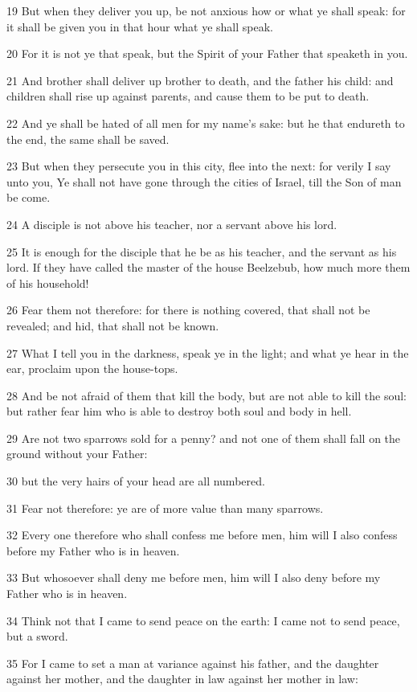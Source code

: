 \par 19 But when they deliver you up, be not anxious how or what ye shall speak: for it shall be given you in that hour what ye shall speak.
\par 20 For it is not ye that speak, but the Spirit of your Father that speaketh in you.
\par 21 And brother shall deliver up brother to death, and the father his child: and children shall rise up against parents, and cause them to be put to death.
\par 22 And ye shall be hated of all men for my name's sake: but he that endureth to the end, the same shall be saved.
\par 23 But when they persecute you in this city, flee into the next: for verily I say unto you, Ye shall not have gone through the cities of Israel, till the Son of man be come.
\par 24 A disciple is not above his teacher, nor a servant above his lord.
\par 25 It is enough for the disciple that he be as his teacher, and the servant as his lord. If they have called the master of the house Beelzebub, how much more them of his household!
\par 26 Fear them not therefore: for there is nothing covered, that shall not be revealed; and hid, that shall not be known.
\par 27 What I tell you in the darkness, speak ye in the light; and what ye hear in the ear, proclaim upon the house-tops.
\par 28 And be not afraid of them that kill the body, but are not able to kill the soul: but rather fear him who is able to destroy both soul and body in hell.
\par 29 Are not two sparrows sold for a penny? and not one of them shall fall on the ground without your Father:
\par 30 but the very hairs of your head are all numbered.
\par 31 Fear not therefore: ye are of more value than many sparrows.
\par 32 Every one therefore who shall confess me before men, him will I also confess before my Father who is in heaven.
\par 33 But whosoever shall deny me before men, him will I also deny before my Father who is in heaven.
\par 34 Think not that I came to send peace on the earth: I came not to send peace, but a sword.
\par 35 For I came to set a man at variance against his father, and the daughter against her mother, and the daughter in law against her mother in law:
